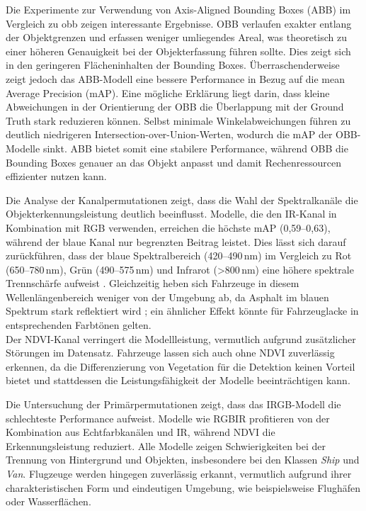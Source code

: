 Die Experimente zur Verwendung von Axis-Aligned Bounding Boxes (ABB) im Vergleich zu \acrfull{obb} zeigen interessante Ergebnisse. OBB verlaufen exakter entlang der Objektgrenzen und erfassen weniger umliegendes Areal, was theoretisch zu einer höheren Genauigkeit bei der Objekterfassung führen sollte. Dies zeigt sich in den geringeren Flächeninhalten der Bounding Boxes. Überraschenderweise zeigt jedoch das ABB-Modell eine bessere Performance in Bezug auf die mean Average Precision (mAP). Eine mögliche Erklärung liegt darin, dass kleine Abweichungen in der Orientierung der OBB die Überlappung mit der Ground Truth stark reduzieren können. Selbst minimale Winkelabweichungen führen zu deutlich niedrigeren Intersection-over-Union-Werten, wodurch die mAP der OBB-Modelle sinkt. ABB bietet somit eine stabilere Performance, während OBB die Bounding Boxes genauer an das Objekt anpasst und damit Rechenressourcen effizienter nutzen kann. 

Die Analyse der Kanalpermutationen zeigt, dass die Wahl der Spektralkanäle die Objekterkennungsleistung deutlich beeinflusst. Modelle, die den IR-Kanal in Kombination mit RGB verwenden, erreichen die höchste mAP (0,59–0,63), während der blaue Kanal nur begrenzten Beitrag leistet. Dies lässt sich darauf zurückführen, dass der blaue Spektralbereich (420–490 nm) im Vergleich zu Rot (650–780 nm), Grün (490–575 nm) und Infrarot (>800 nm) eine höhere spektrale Trennschärfe aufweist \cite{bfs_Strahlung}. Gleichzeitig heben sich Fahrzeuge in diesem Wellenlängenbereich weniger von der Umgebung ab, da Asphalt im blauen Spektrum stark reflektiert wird \cite{Singh2013}; ein ähnlicher Effekt könnte für Fahrzeuglacke in entsprechenden Farbtönen gelten. \\
Der NDVI-Kanal verringert die Modellleistung, vermutlich aufgrund zusätzlicher Störungen im Datensatz. Fahrzeuge lassen sich auch ohne NDVI zuverlässig erkennen, da die Differenzierung von Vegetation für die Detektion keinen Vorteil bietet und stattdessen die Leistungsfähigkeit der Modelle beeinträchtigen kann.

Die Untersuchung der Primärpermutationen zeigt, dass das IRGB-Modell die schlechteste Performance aufweist. Modelle wie RGBIR profitieren von der Kombination aus Echtfarbkanälen und IR, während NDVI die Erkennungsleistung reduziert. Alle Modelle zeigen Schwierigkeiten bei der Trennung von Hintergrund und Objekten, insbesondere bei den Klassen \textit{Ship} und \textit{Van}. Flugzeuge werden hingegen zuverlässig erkannt, vermutlich aufgrund ihrer charakteristischen Form und eindeutigen Umgebung, wie beispielsweise Flughäfen oder Wasserflächen. %

